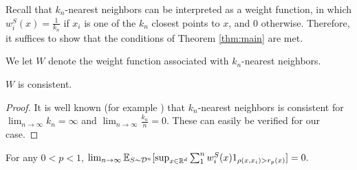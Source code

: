 Recall that $k_n$-nearest neighbors can be interpreted as a weight function, in which $w_i^S(x) = \frac{1}{k_n}$ if $x_i$ is one of the $k_n$ closest points to $x$, and $0$ otherwise. Therefore, it suffices to show that the conditions of Theorem \ref{thm:main} are met. 

We let $W$ denote the weight function associated with $k_n$-nearest neighbors.

\begin{lem}
$W$ is consistent.
\end{lem}

\begin{proof}
It is well known (for example \cite{Dasgupta14}) that $k_n$-nearest neighbors is consistent for $\lim_{n \to \infty} k_n = \infty$ and $\lim_{n \to \infty} \frac{k_n}{n} = 0$. These can easily be verified for our case.
\end{proof}

\begin{lem}
For any $0 < p < 1$, $\lim_{n \to \infty} \mathbb{E}_{S \sim {\mathcal D}^n}[ \sup_{x \in \mathbb R^d} \sum_1^n w_i^S(x)1_{\rho(x, x_i) > r_p(x)}] = 0.$ 
\end{lem}

